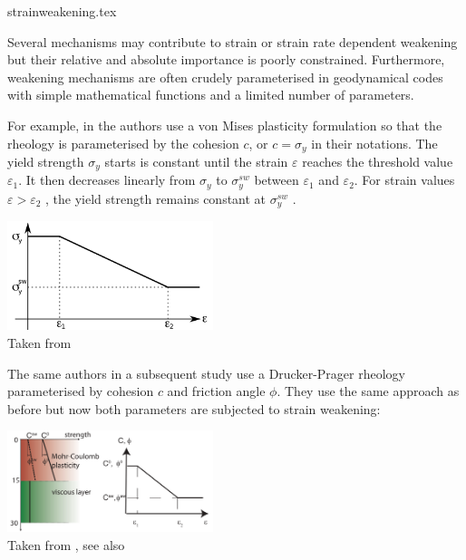 \begin{flushright} {\tiny {\color{gray} strainweakening.tex}} \end{flushright}

Several mechanisms may contribute to strain or strain
rate dependent weakening but their relative and absolute
importance is poorly constrained. Furthermore, 
weakening mechanisms are often crudely parameterised in 
geodynamical codes with simple mathematical functions 
and a limited number of parameters. 

For example, in \cite{alht11} the authors use a von Mises plasticity formulation so that the 
rheology is parameterised by the cohesion $c$, or $c=\sigma_y$ in their notations. The
yield strength $\sigma_y$ starts is constant until the strain
$\varepsilon$ reaches the threshold value $\varepsilon_1$. It then decreases linearly
from $\sigma_y$ to $\sigma_{y}^{sw}$ between $\varepsilon_1$ and $\varepsilon_2$. 
For strain values $\varepsilon>\varepsilon_2$ , the yield strength remains constant 
at $\sigma_y^{sw}$ .

\begin{center}
\includegraphics[width=6cm]{images/strainweakening/alht11}\\
{\tiny Taken from \cite{alht11}}
\end{center}

The same authors in a subsequent study use a Drucker-Prager rheology parameterised by 
cohesion $c$ and friction angle $\phi$. They use the same approach as before but now 
both parameters are subjected to strain weakening: 

\begin{center}
\includegraphics[width=6cm]{images/strainweakening/alht12}\\
{\tiny Taken from \cite{alht12}, see also \cite{thie11}}
\end{center}


